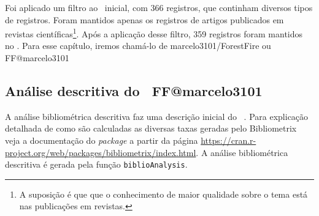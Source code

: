 Foi aplicado um filtro ao \dataset\   inicial, com 366 registros, que continham diversos tipos de registros. Foram mantidos apenas os registros de artigos publicados em revistas científicas\footnote{A suposição é que que o conhecimento de maior qualidade sobre o tema está nas publicações em revistas.}. Após a aplicação desse filtro, 359 registros foram mantidos no \dataset. Para esse capítulo, iremos chamá-lo de marcelo3101/ForestFire ou FF@marcelo3101

\subsection{Análise descritiva do \dataset\   FF@marcelo3101}

A análise bibliométrica descritiva faz uma descrição inicial do \dataset\  . Para explicação detalhada de como são calculadas as diversas taxas geradas pelo Bibliometrix veja a documentação do \textit{package} a partir da página \url{https://cran.r-project.org/web/packages/bibliometrix/index.html}. A análise bibliométrica descritiva é gerada pela função \texttt{biblioAnalysis}.

